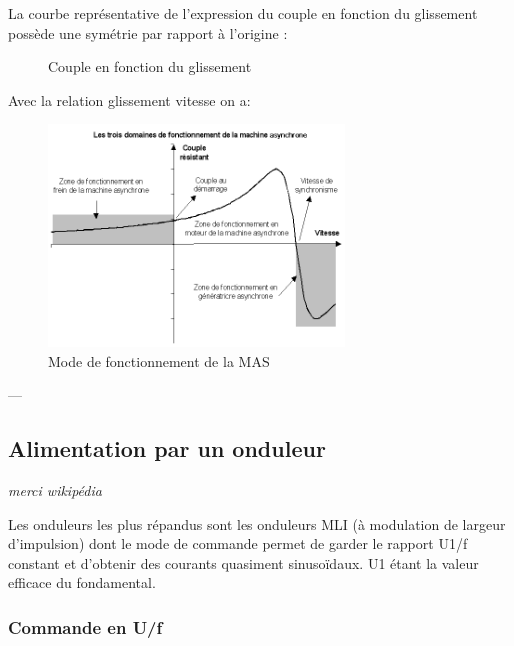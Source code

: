 \documentclass[main.tex]{subfiles}
\begin{document}
La courbe représentative de l'expression du couple en fonction du glissement possède une symétrie par rapport à l'origine :
\begin{figure}[H]
  \centering
  \caption{Couple en fonction du glissement}
\end{figure}

Avec la relation glissement vitesse on a:
\begin{figure}[H]
  \centering
  \includegraphics[width=0.7\textwidth]{Domaines_fonctionnement_MAs.png}
  \caption{Mode de fonctionnement de la MAS}
\end{figure}
---

\subsection{Alimentation par un onduleur}
\emph{merci wikipédia}
\bigskip

Les onduleurs les plus répandus sont les onduleurs MLI (à modulation de largeur d'impulsion) dont le mode de commande permet de garder le rapport U1/f constant et d'obtenir des courants quasiment sinusoïdaux. U1 étant la valeur efficace du fondamental.
\subsubsection{Commande en U/f}
\end{document}
